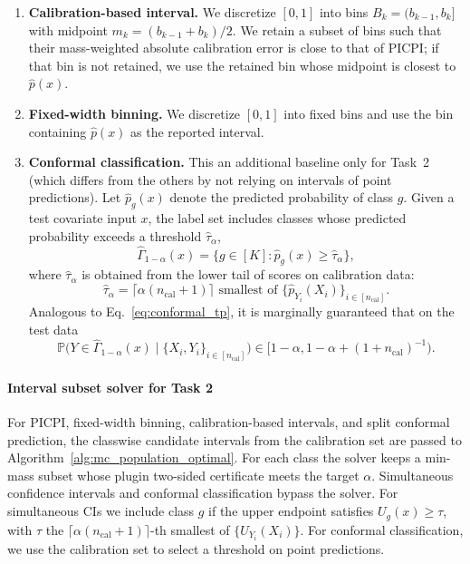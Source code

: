\documentclass[11pt]{article}
\theoremstyle{statplain}
\theoremstyle{statdefinition}
\newcommand{\PP}{\mathbb{P}}
\newcommand{\0}{\mathbf{0}}
\newcommand{\titleShort}{PICPI\xspace}
\begin{document}
\begin{enumerate}
\item \textbf{Calibration-based interval.}
We discretize $[0,1]$ into bins $B_k=(b_{k-1},b_k]$ with midpoint $m_k=(b_{k-1}+b_k)/2$. 
We retain a subset of bins such that their mass-weighted absolute calibration error is close to that of \titleShort; if that bin is not retained, we use the retained bin whose midpoint is closest to $\hat p(x)$.

\item \textbf{Fixed-width binning.} We discretize $[0,1]$ into fixed bins and use the bin containing $\hat p(x)$ as the reported interval.

\item \textbf{Conformal classification.}
This an additional baseline only for Task~2 (which differs from the others by not relying on intervals of point predictions). Let $\hat p_g(x)$ denote the predicted probability of class $g$. 
Given a test covariate input $x$, the label set includes classes whose predicted probability exceeds a threshold $\hat \tau_\alpha$,
\[
\widehat \Gamma_{1-\alpha}(x)
=
\{g \in [K] : \hat p_g(x) \ge \hat \tau_\alpha\},
\]
where $\hat \tau_\alpha$ is obtained from the lower tail of scores on calibration data:
\[
\hat \tau_\alpha = \lceil\alpha(n_\mathrm{cal} + 1)\rceil \text{ smallest of $\{\hat p_{Y_i}(X_i)\}_{ i\in{[n_\mathrm{cal}]}}$}.
\]
Analogous to Eq.~\eqref{eq:conformal_tp}, it is marginally guaranteed that on the test data 
\[
\PP\Big(Y \in \widehat \Gamma_{1-\alpha}(x)\mid \{X_i, Y_i\}_{i\in [n_\mathrm{cal}]}\Big) \in \Big[1-\alpha,1-\alpha+(1+n_\mathrm{cal})^{-1}\Big).
\]
\end{enumerate}




\paragraph{Interval subset solver for Task 2} For \titleShort, fixed-width binning, calibration-based intervals, and split conformal prediction, the classwise candidate intervals from the calibration set are passed to Algorithm~\ref{alg:mc_population_optimal}. For each class the solver keeps a min-mass subset whose plugin two-sided certificate meets the target \(\alpha\). Simultaneous confidence intervals and conformal classification bypass the solver. For simultaneous CIs we include class \(g\) if the upper endpoint satisfies \(U_g(x)\ge\tau\), with \(\tau\) the \(\lceil\alpha(n_{\mathrm{cal}}+1)\rceil\)-th smallest of \(\{U_{Y_i}(X_i)\}\). For conformal classification, we use the calibration set to select a threshold on point predictions. 
\end{document}
